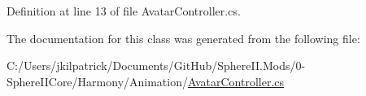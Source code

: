 Definition at line 13 of file Avatar\+Controller.\+cs.



The documentation for this class was generated from the following file\+:\begin{DoxyCompactItemize}
\item 
C\+:/\+Users/jkilpatrick/\+Documents/\+Git\+Hub/\+Sphere\+I\+I.\+Mods/0-\/\+Sphere\+I\+I\+Core/\+Harmony/\+Animation/\mbox{\hyperlink{_avatar_controller_8cs}{Avatar\+Controller.\+cs}}\end{DoxyCompactItemize}
